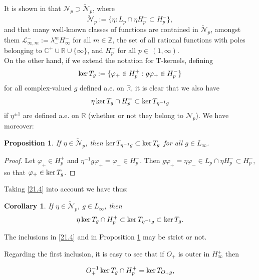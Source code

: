 \documentclass[11pt]{article}
\def\RR{\mathbb{R}}
\def\ker{\mathop{\rm ker}\nolimits}
\renewcommand\phi{\varphi}
\newtheorem{prop}[thm]{Proposition}
\newtheorem{cor}[thm]{Corollary}
\numberwithin{equation}{section}
\def\beginpf{\begin{proof}}
\def\endpf{\end{proof}}
\begin{document}
It is shown in \cite{CP14} that $\mathcal{N}_p \supset \widetilde{\mathcal{N}}_p$, where
\[\widetilde{\mathcal{N}}_p :=\{\eta:L_p \cap \eta H_p^-\subset H_p^-\},\]
and that many well-known classes of functions are contained in $\widetilde{\mathcal{N}}_p$, amongst them 
$\mathcal{L}^-_{\infty,m}:=\lambda_-^m H_\infty^-$ for all $m \in \mathbb{Z}$, the set of all rational functions with poles 
belonging to $\mathbb{C}^+\cup \RR \cup \{\infty\}$, and $H_p^-$ for all $p \in \,(1, \infty)$.\\

On the other hand, if we extend the notation for T-kernels, defining
\begin{equation}\label{21.3}
\ker T_g:=\{\phi_+ \in H_p^+: g\phi_+ \in H_p^-\}
\end{equation}
for all complex-valued $g$ defined a.e. on $\RR$, it is clear that we also have
\begin{equation}\label{21.4}
\eta\ker T_g\cap H_p^+ \subset \ker T_{\eta^{-1}g}
\end{equation}
if $\eta^{\pm 1}$ are defined a.e. on $\RR$ (whether or not they belong to $\mathcal{N}_p$). We have moreover:

\begin{prop}\label{thm:2.2} If $\eta \in \widetilde{\mathcal{N}}_p$, then $\ker T_{\eta^{-1}g}\subset \ker T_g$ for all $g \in L_\infty$.
\end{prop}

\beginpf Let $\phi_+ \in H_p^+$ and $\eta^{-1}g\phi_+=\phi_- \in H_p^-$. Then $g\phi_+=\eta\phi_- \in L_p \cap \eta H_p^- \subset H_p^-$, so that $\phi_+ \in \ker T_g$.
\endpf

Taking \eqref{21.4} into account we have thus:

\begin{cor}\label{cor:2.3} If $\eta \in \widetilde{\mathcal{N}}_p$, $g \in L_\infty$, then
\begin{equation}\label{21.5}
\eta \ker T_g \cap H_p^+ \subset \ker T_{\eta^{-1}g} \subset \ker T_g.
\end{equation}
\end{cor}

The inclusions in \eqref{21.4} and in Proposition \ref{thm:2.2} may be strict or not.

Regarding the first inclusion, it is easy to see that if $ {O}_+$ is outer in $H_\infty^+ $ then

\begin{equation}\label{21.6}
{O}_+^{-1} \ker T_g \cap H_p^+ = \ker T_{ {O}_+ g},
\end{equation}
\end{document}
